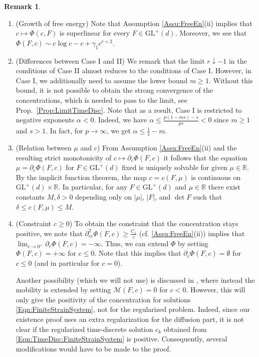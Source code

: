 \documentclass[a4paper,12pt]{article}
\newcommand{\R}{\mathbb{R}}
\newcommand{\calM}{\mathcal{M}}
\newcommand{\pl}{\partial}
\newcommand{\GL}{\mathrm{GL}}
\theoremstyle{plain}
\theoremstyle{definition}
\newtheorem{Rem}[Th]{Remark}
\numberwithin{equation}{section}
\begin{document}
    \begin{Rem}%
		\begin{enumerate}[label=(\roman*),ref=\theRem(\roman*)]
    \item(Growth of free energy) Note that Assumption \ref{Assu:FreeEn}(ii) implies that $c\mapsto \Phi(c,F)$ is superlinear for every $F\in\GL^+(d)$. Moreover, we see that $\Phi(F,c) \sim c\log c -c +\gamma_1 c^{r+2}$.

\item\label{Rem:DiffCaseI/II}(Differences between Case I and II) We remark that the limit $r \downarrow-1$ in the conditions of Case II almost reduces to the conditions of Case I. However, 
in Case I, we additionally need to assume the lower bound $m\geq 1$. Without this bound, it is not possible to obtain the strong convergence of the concentrations, which is needed to pass to the limit, see Prop.~\ref{Prop:LimitTimeDisc}. Note that as a result, Case I is restricted to negative exponents $\alpha< 0$. Indeed, we have $\alpha\leq \frac{p(1-ms)-s}{ps} <0$
since $m\geq 1$ and $s>1$. In fact,
for $p\to \infty$, we get $\alpha\leq \frac{1}{s}-m$.

%
    
    \item\label{Rem:RelationMuC}(Relation between $\mu$ and $c$) From Assumption \ref{Assu:FreeEn}(ii) and the resulting strict monotonicity of $c\mapsto \pl_c\Phi(F,c)$ 
	it follows that the equation $\mu = \pl_c\Phi(F,c)$ for $F\in\GL^+(d)$ fixed is uniquely solvable for given $\mu\in\R$. By the implicit function theorem, the map $c=c(F,\mu)$ is continuous on $\GL^+(d)\times \R$. In particular, for any $F\in\GL^+(d)$ and $\mu\in\R$ there exist constants $M,\delta>0$ depending only on 
	$|\mu|$, $|F|$, and $\det F$ such that $\delta \leq c(F,\mu)\leq M$. 
    
    \item(Constraint $c\geq 0$)    To obtain the constraint that the concentration stays positive, we note that $\pl^2_{cc} \Phi(F,c)\geq \frac{C_1}{c}$ (cf. \ref{Assu:FreeEn}(ii)) implies that $\lim_{c\to 0^+}\pl_c \Phi(F,c) = -\infty$. Thus, we can extend $\Phi$ by setting $\Phi(F,c) = +\infty$ for $c\leq 0$. Note that this implies that $\pl_c\Phi(F,c) = \emptyset$ for $c\leq 0$ (and in particular for $c=0$).
    
    Another possibility (which we will not use) is discussed in \cite[Rem.~2]{Roub2017ECTDfPEM}, where instead the mobility is extended by setting $\calM(F,c)=0$ for $c<0$. However, this will only give the positivity of the concentration for solutions \eqref{Eqn:FiniteStrainSystem}, not for the regularized problem. Indeed, since our existence proof uses an extra regularization for the diffusion part, it is not clear if the regularized time-discrete solution $c_k$ obtained from \eqref{Eqn:TimeDisc:FiniteStrainSystem} is positive. Consequently, several modifications would have to be made to the proof.
    

\end{enumerate}
\end{Rem}
\end{document}
